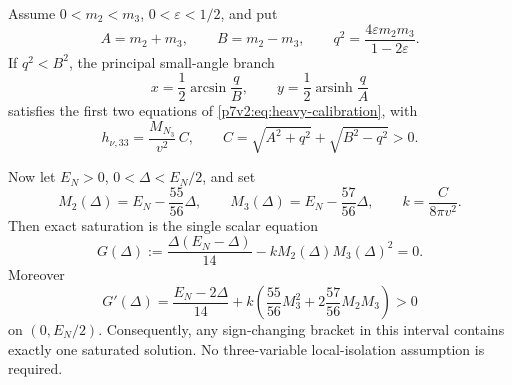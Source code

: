 \documentclass[11pt,a4paper]{article}
\begin{document}
\begin{theorem}
\label{p7v2:thm:heavy-calibration-reduction}
Assume \(0<m_2<m_3\), \(0<\varepsilon<1/2\), and put
\[
 A=m_2+m_3,\qquad B=m_2-m_3,
 \qquad
 q^2=\frac{4\varepsilon m_2m_3}{1-2\varepsilon}.
\]
If \(q^2<B^2\), the principal small-angle branch
\begin{equation}
\label{p7v2:eq:heavy-angle-closed-form}
 x=\frac12\arcsin\frac qB,
 \qquad
 y=\frac12\operatorname{arsinh}\frac qA
\end{equation}
satisfies the first two equations of
\eqref{p7v2:eq:heavy-calibration}, with
\begin{equation}
\label{p7v2:eq:heavy-C-coefficient}
 h_{\nu,33}=\frac{M_{N_3}}{v^2}\,C,
 \qquad
 C=\sqrt{A^2+q^2}+\sqrt{B^2-q^2}>0.
\end{equation}

Now let \(E_N>0\), \(0<\Delta<E_N/2\), and set
\[
 M_2(\Delta)=E_N-\frac{55}{56}\Delta,
 \qquad
 M_3(\Delta)=E_N-\frac{57}{56}\Delta,
 \qquad
 k=\frac{C}{8\pi v^2}.
\]
Then exact saturation is the single scalar equation
\begin{equation}
\label{p7v2:eq:heavy-monotone-equation}
 G(\Delta)
 :=\frac{\Delta(E_N-\Delta)}{14}
   -kM_2(\Delta)M_3(\Delta)^2
 =0.
\end{equation}
Moreover
\begin{equation}
\label{p7v2:eq:heavy-monotonicity}
 G'(\Delta)
 =\frac{E_N-2\Delta}{14}
 +k\left(
   \frac{55}{56}M_3^2
   +2\frac{57}{56}M_2M_3
 \right)>0
\end{equation}
on \((0,E_N/2)\).  Consequently, any sign-changing bracket in this interval
contains exactly one saturated solution.  No three-variable local-isolation
assumption is required.
\end{theorem}
\end{document}

